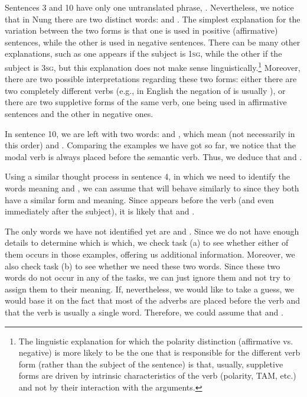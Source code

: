 \begin{refsection}
\begin{mysolution}
\begin{description}[labelwidth=\widthof{\bfseries Step 3.},leftmargin=!]
Sentences 3 and 10 have only one untranslated phrase, . Nevertheless, we notice that in Nung there are two distinct words:  and . The simplest explanation for the variation between the two forms is that one is used in positive (affirmative) sentences, while the other is used in negative sentences. There can be many other explanations, such as one appears if the subject is 1\textsc{sg}, while the other if the subject is 3\textsc{sg}, but this explanation does not make sense linguistically.\footnote{The linguistic explanation for which the polarity distinction (affirmative vs. negative) is more likely to be the one that is responsible for the different verb form (rather than the subject of the sentence) is that, usually, suppletive forms are driven by intrinsic characteristics of the verb (polarity, TAM, etc.) and not by their interaction with the arguments.} Moreover, there are two possible interpretations regarding these two forms: either there are two completely different verbs (e.g., in English the negation of  is usually ), or there are two suppletive forms of the same verb, one being used in affirmative sentences and the other in negative ones. 

\item[Step 5.] In sentence 10, we are left with two words:  and , which mean (not necessarily in this order)  and . Comparing the examples we have got so far, we notice that the modal verb is always placed before the semantic verb. Thus, we deduce that  and .

Using a similar thought process in sentence 4, in which we need to identify the words meaning  and , we can assume that  will behave similarly to  since they both have a similar form and meaning. Since  appears before the verb (and even immediately after the subject), it is likely that  and .

The only words we have not identified yet are  and . Since we do not have enough details to determine which is which, we check task (a) to see whether either of them occurs in those examples, offering us additional information. Moreover, we also check task (b) to see whether we need these two words. Since these two words do not occur in any of the tasks, we can just ignore them and not try to assign them to their meaning. If, nevertheless, we would like to take a guess, we would base it on the fact that most of the adverbs are placed before the verb and that the verb is usually a single word. Therefore, we could assume that  and .


\end{description}
\end{mysolution}
\end{refsection}

